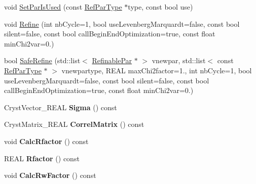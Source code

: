 \begin{DoxyCompactItemize}
void \mbox{\hyperlink{class_obj_cryst_1_1_l_s_q_num_obj_a3164f80e5cecec4920aa8fae530a4ebe}{Set\+Par\+Is\+Used}} (const \mbox{\hyperlink{class_obj_cryst_1_1_ref_par_type}{Ref\+Par\+Type}} $\ast$type, const bool use)
\item 
void \mbox{\hyperlink{class_obj_cryst_1_1_l_s_q_num_obj_aaf5ceefe54c4fdfd0e48c3f5cd4f66b9}{Refine}} (int nb\+Cycle=1, bool use\+Levenberg\+Marquardt=false, const bool silent=false, const bool call\+Begin\+End\+Optimization=true, const float min\+Chi2var=0.)
\item 
bool \mbox{\hyperlink{class_obj_cryst_1_1_l_s_q_num_obj_a61c7c1de61a88c742e0ab8194a6c8db9}{Safe\+Refine}} (std\+::list$<$ \mbox{\hyperlink{class_obj_cryst_1_1_refinable_par}{Refinable\+Par}} $\ast$ $>$ vnewpar, std\+::list$<$ const \mbox{\hyperlink{class_obj_cryst_1_1_ref_par_type}{Ref\+Par\+Type}} $\ast$ $>$ vnewpartype, R\+E\+AL max\+Chi2factor=1., int nb\+Cycle=1, bool use\+Levenberg\+Marquardt=false, const bool silent=false, const bool call\+Begin\+End\+Optimization=true, const float min\+Chi2var=0.)
\item 
\mbox{\label{class_obj_cryst_1_1_l_s_q_num_obj_a5d9dc0ea73f1a24a9b5597c6ca1bb24d}} 
Cryst\+Vector\+\_\+\+R\+E\+AL {\bfseries Sigma} () const
\item 
\mbox{\label{class_obj_cryst_1_1_l_s_q_num_obj_a848ab123263a5b5c2e68b8cb3be20fc5}} 
Cryst\+Matrix\+\_\+\+R\+E\+AL {\bfseries Correl\+Matrix} () const
\item 
\mbox{\label{class_obj_cryst_1_1_l_s_q_num_obj_ae4e75b95a8a7bcd7d48375f00baf3136}} 
void {\bfseries Calc\+Rfactor} () const
\item 
\mbox{\label{class_obj_cryst_1_1_l_s_q_num_obj_a1ee3fe63e440f215ac4c47c667a12589}} 
R\+E\+AL {\bfseries Rfactor} () const
\item 
\mbox{\label{class_obj_cryst_1_1_l_s_q_num_obj_a0c5ac737a9f8896cb75189812d24e286}} 
void {\bfseries Calc\+Rw\+Factor} () const
\item 
\mbox{\label{class_obj_cryst_1_1_l_s_q_num_obj_a15240013ae99a29a3d6f7004c998aade}} 

\end{DoxyCompactItemize}
